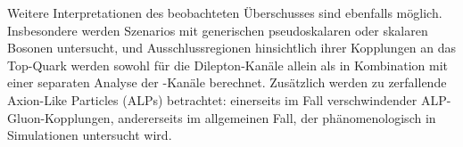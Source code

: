 Weitere Interpretationen des beobachteten Überschusses sind ebenfalls m{\"o}glich.
Insbesondere werden Szenarios mit generischen pseudoskalaren oder skalaren Bosonen untersucht, und Ausschlussregionen 
hinsichtlich ihrer Kopplungen an das Top-Quark werden sowohl f{\"u}r die Dilepton-Kan{\"a}le allein als in Kombination mit einer separaten Analyse der \ljets-Kan{\"a}le berechnet. Zus{\"a}tzlich werden zu \ttbar zerfallende Axion-Like Particles (ALPs) betrachtet: einerseits im Fall verschwindender ALP-Gluon-Kopplungen, andererseits im allgemeinen Fall, der ph{\"a}nomenologisch in Simulationen untersucht wird.

